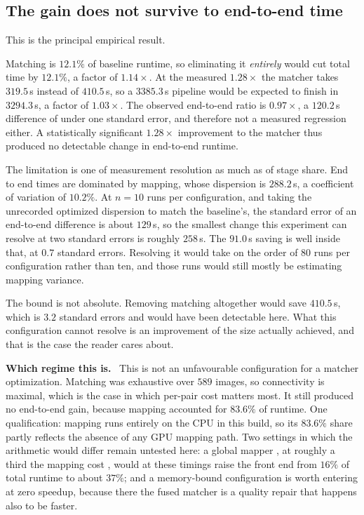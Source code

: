 \documentclass[conference]{IEEEtran}
\newcommand{\para}[1]{\smallskip\noindent\textbf{#1}\ }
\begin{document}
\subsection{The gain does not survive to end-to-end time}
\label{sec:endtoend}

This is the principal empirical result.

Matching is $12.1\%$ of baseline runtime, so eliminating it \emph{entirely}
would cut total time by $12.1\%$, a factor of $1.14\times$. At the measured
$1.28\times$ the matcher takes $319.5$\,s instead of $410.5$\,s, so a
$3385.3$\,s pipeline would be expected to finish in $3294.3$\,s, a factor of
$1.03\times$. The observed end-to-end ratio is $0.97\times$, a $120.2$\,s
difference of under one standard error, and therefore not a measured regression
either. A statistically significant $1.28\times$ improvement to the matcher
thus produced no detectable change in end-to-end runtime.

The limitation is one of measurement resolution as much as of stage share. End
to end times are dominated by mapping, whose dispersion is $288.2$\,s, a
coefficient of variation of $10.2\%$. At $n = 10$ runs per configuration, and
taking the unrecorded optimized dispersion to match the baseline's, the
standard error of an end-to-end difference is about $129$\,s, so the
smallest change this experiment can resolve at two standard errors is roughly
$258$\,s. The $91.0$\,s saving is well inside that, at $0.7$ standard errors.
Resolving it would take on the order of $80$ runs per configuration rather than
ten, and those runs would still mostly be estimating mapping variance.

The bound is not absolute. Removing matching altogether would save $410.5$\,s,
which is $3.2$ standard errors and would have been detectable here. What this
configuration cannot resolve is an improvement of the size actually achieved, and
that is the case the reader cares about.

\para{Which regime this is.} This is not an unfavourable configuration for a
matcher optimization. Matching was exhaustive over $589$ images, so connectivity
is maximal, which is the case in which per-pair cost matters most. It still
produced no end-to-end gain, because mapping accounted for $83.6\%$ of runtime.
One qualification: mapping runs entirely on the CPU in this build, so its
$83.6\%$ share partly reflects the absence of any GPU mapping path. Two settings in which the arithmetic would differ remain
untested here: a global mapper \cite{pan2024global}, at roughly a third the
mapping cost \cite{yu2025cusfm}, would at these timings raise the front end
from $16\%$ of total runtime to about $37\%$; and a memory-bound configuration
is worth entering at zero
speedup, because there the fused matcher is a quality repair that happens also
to be faster.
\end{document}
